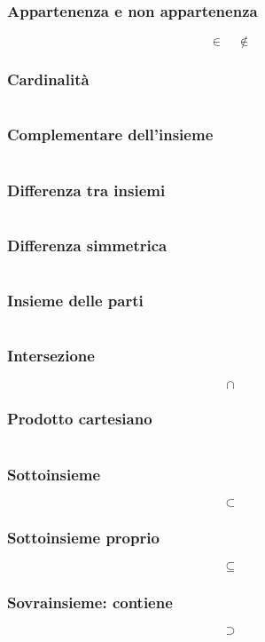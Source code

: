 \documentclass[a4paper,14pt]{extarticle}
\begin{document}
\subsubsection{Appartenenza e non appartenenza}
\[ \in \quad \notin \]

\subsubsection{Cardinalità}
\[ \]

\subsubsection{Complementare dell'insieme}
\[ \]

\subsubsection{Differenza tra insiemi}
\[ \]

\subsubsection{Differenza simmetrica}
\[ \]

\subsubsection{Insieme delle parti}
\[ \]

\subsubsection{Intersezione}
\[ \cap \]

\subsubsection{Prodotto cartesiano}
\[ \]

\subsubsection{Sottoinsieme}
\[ \subset \]

\subsubsection{Sottoinsieme proprio}
\[ \subseteq \]

\subsubsection{Sovrainsieme: contiene}
\[ \supset \]
\end{document}

